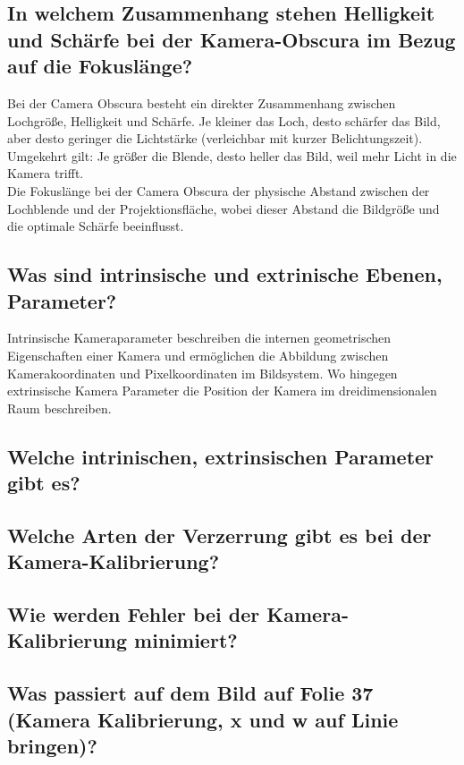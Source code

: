 \subsection{In welchem Zusammenhang stehen Helligkeit und Schärfe bei der Kamera-Obscura im Bezug auf die Fokuslänge?}
Bei der Camera Obscura besteht ein direkter Zusammenhang zwischen Lochgröße, Helligkeit und Schärfe. Je kleiner das Loch, 
desto schärfer das Bild, aber desto geringer die Lichtstärke (verleichbar mit kurzer Belichtungszeit). Umgekehrt gilt: Je größer die 
Blende, desto heller das Bild, weil mehr Licht in die Kamera trifft.\\

\noindent
Die Fokuslänge bei der Camera Obscura der physische Abstand zwischen der Lochblende und der Projektionsfläche, wobei dieser
Abstand die Bildgröße und die optimale Schärfe beeinflusst.


\subsection{Was sind intrinsische und extrinische Ebenen, Parameter?}
Intrinsische Kameraparameter beschreiben die internen geometrischen Eigenschaften einer Kamera und ermöglichen die Abbildung zwischen 
Kamerakoordinaten und Pixelkoordinaten im Bildsystem. Wo hingegen extrinsische Kamera Parameter die Position der Kamera
im dreidimensionalen Raum beschreiben.

\subsection{Welche intrinischen, extrinsischen Parameter gibt es?}

\subsection{Welche Arten der Verzerrung gibt es bei der Kamera-Kalibrierung?}

\subsection{Wie werden Fehler bei der Kamera-Kalibrierung minimiert?}

\subsection{Was passiert auf dem Bild auf Folie 37 (Kamera Kalibrierung, x und w auf Linie bringen)?}

